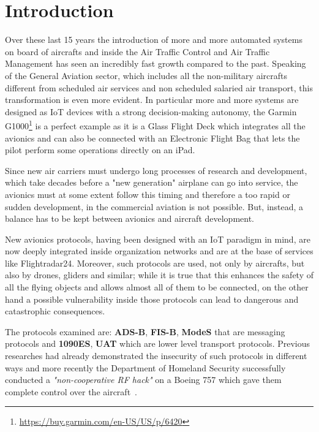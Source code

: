 \documentclass[../main.tex]{subfiles}
\begin{document}
\chapter{Introduction}

Over these last 15 years the introduction of more and more automated systems on board of aircrafts and inside the Air Traffic Control and Air Traffic Management has seen an incredibly fast growth compared to the past. Speaking of the General Aviation sector, which includes all the non-military aircrafts different from scheduled air services and non scheduled salaried air transport, this transformation is even more evident. In particular more and more systems are designed as IoT devices with a strong decision-making autonomy, the Garmin G1000\footnote{\url{https://buy.garmin.com/en-US/US/p/6420}} is a perfect example as it is a Glass Flight Deck which integrates all the avionics and can also be connected with an Electronic Flight Bag that lets the pilot perform some operations directly on an iPad.

Since new air carriers must undergo long processes of research and development, which take decades before a "new generation" airplane can go into service, the avionics must at some extent follow this timing and therefore a too rapid or sudden development, in the commercial aviation is not possible. But, instead, a balance has to be kept between avionics and aircraft development.

New avionics protocols, having been designed with an IoT paradigm in mind, are now deeply integrated inside organization networks and are at the base of services like Flightradar24. Moreover, such protocols are used, not only by aircrafts, but also by drones, gliders and similar; while it is true that this enhances the safety of all the flying objects and allows almost all of them to be connected, on the other hand a possible vulnerability inside those protocols can lead to dangerous and catastrophic consequences.

The protocols examined are: \textbf{ADS-B}, \textbf{FIS-B}, \textbf{ModeS} that are messaging protocols and \textbf{1090ES}, \textbf{UAT} which are lower level transport protocols. Previous researches had already demonstrated the insecurity of such protocols in different ways and more recently the Department of Homeland Security successfully conducted a \emph{"non-cooperative RF hack"} on a Boeing 757 which gave them complete control over the aircraft~\cite{news-boeinghack-cso}.
\end{document}
